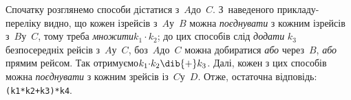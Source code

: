 \Tutorial
Спочатку розглянемо способи дістатися з~$A$\nolinebreak[3] до~$C$.
З~наведеного прикладу-переліку видно, що кожен із\nolinebreak[2] рейсів з~$A$\nolinebreak[3] у~$B$ можна \emph{поєднувати} з кожним із\nolinebreak[2] рейсів з~$B$\nolinebreak[3] у~$C$, тому треба \emph{множити}\nolinebreak[2] ${k_1\cdot{}k_2}$; до цих способів слід \emph{додати} $k_3$ безпосередніх рейсів з~$A$\nolinebreak[3] у~$C$, бо\nolinebreak[2] з~$A$\nolinebreak[3] до~$C$ можна добиратися \emph{або} через~$B$, \emph{або} прямим рейсом. Так отримуємо\nolinebreak[2] ${k_1{\cdot}k_2}\dib{{+}}k_3$. Далі, кожен з цих способів можна \emph{поєднувати} з кожним з\nolinebreak[2] рейсів із~$C$\nolinebreak[3] у~$D$. Отже, остаточна відповідь: \texttt{(k1*k2+k3)*k4}. 

